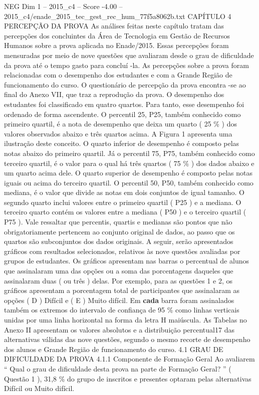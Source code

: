 \begin{textsample}{NEG Dim 1 – 2015\_c4 – Score -4.00 – 2015\_c4/enade\_2015\_tec\_gest\_rec\_hum\_77f5a8062b.txt}  \label{ex:f1_neg_105}
CAPÍTULO 4 PERCEPÇÃO DA PROVA As análises feitas neste capítulo tratam das percepções dos concluintes da Área de Tecnologia em Gestão de Recursos Humanos sobre a prova aplicada no Enade/2015.
Essas percepções foram mensuradas por meio de nove questões que avaliaram desde o grau de dificuldade da prova até o tempo gasto para concluí -la.
As percepções sobre a prova foram relacionadas com o desempenho dos estudantes e com a Grande Região de funcionamento do curso.
O questionário de percepção da prova encontra -se ao final do Anexo VII, que traz a reprodução da prova.
O desempenho dos estudantes foi classificado em quatro quartos.
Para tanto, esse desempenho foi ordenado de forma ascendente.
O percentil 25, P25, também conhecido como primeiro quartil, é a nota de desempenho que deixa um quarto ( 25 \% ) dos valores observados abaixo e três quartos acima.
A Figura 1 apresenta uma ilustração deste conceito.
O quarto inferior de desempenho é composto pelas notas abaixo do primeiro quartil.
Já o percentil 75, P75, também conhecido como terceiro quartil, é o valor para o qual há três quartos ( 75 \% ) dos dados abaixo e um quarto acima dele.
O quarto superior de desempenho é composto pelas notas iguais ou acima do terceiro quartil.
O percentil 50, P50, também conhecido como mediana, é o valor que divide as notas em dois conjuntos de igual tamanho.
O segundo quarto inclui valores entre o primeiro quartil ( P25 ) e a mediana.
O terceiro quarto contém os valores entre a mediana ( P50 ) e o terceiro quartil ( P75 ).
Vale ressaltar que percentis, quartis e medianas são pontos que não obrigatoriamente pertencem ao conjunto original de dados, ao passo que os quartos são subconjuntos dos dados originais.
A seguir, serão apresentados gráficos com resultados selecionados, relativos às nove questões avaliadas por grupos de estudantes.
Os gráficos apresentam nas barras o percentual de alunos que assinalaram uma das opções ou a soma das porcentagens daqueles que assinalaram duas ( ou três ) delas.
Por exemplo, para as questões 1 e 2, os gráficos apresentam a porcentagem total de participantes que assinalaram as opções ( D ) Difícil e ( E ) Muito difícil.
Em \textbf{cada} barra foram assinalados também os extremos do intervalo de confiança de 95 \% como linhas verticais unidas por uma linha horizontal na forma da letra H maiúscula.
As Tabelas no Anexo II apresentam os valores absolutos e a distribuição percentual17 das alternativas válidas das nove questões, segundo o mesmo recorte de desempenho dos alunos e Grande Região de funcionamento do curso. 4.1 GRAU DE DIFICULDADE DA PROVA 4.1.1 Componente de Formação Geral Ao avaliarem “ Qual o grau de dificuldade desta prova na parte de Formação Geral? ” ( Questão 1 ), 31,8 \% do grupo de inscritos e presentes optaram pelas alternativas Difícil ou Muito difícil.

\end{textsample}
